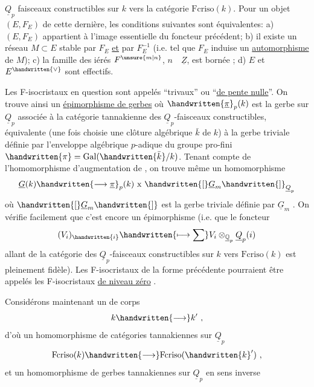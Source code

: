 
$\underline{Q}_p$ faisceaux constructibles sur $k$ vers la catégorie $\mathrm{Fcriso}(k)$. Pour un objet $(E,F_E)$ de cette dernière, les conditions suivantes sont équivalentes: a) $(E,F_E)$ appartient à l'image essentielle du foncteur précédent; b) il existe un réseau $M\subset E$ stable par $F_E$  \uline{et} par $F_E^{-1}$ (i.e. tel que $F_E$ induise un \uline{automorphisme} de $M$); c) la famille des iérés $F^{\unsure{m|n}}$, $n\quad\underline{Z}$, est bornée ; d) $E$ et $E^{\handwritten{\vee}}$ sont effectifs.

Les F-isocristaux en question sont appelés ``trivaux'' ou ``\uline{de pente nulle}''. On trouve ainsi un \uline{épimorphisme de gerbes}
où $\handwritten{\underline{\pi}}_p(k)$ est la gerbe sur $\underline{Q}_p$  associée à la catégorie tannakienne des $\underline{Q}_p$-faisceaux constructibles, équivalente  (une fois choisie une clôture algébrique $\bar{k}$ de $k$) à la gerbe triviale définie par l'enveloppe algébrique  $p$-adique du groupe pro-fini $\handwritten{\pi}=\operatorname{Gal}(\handwritten{\bar{k}}/k)$. Tenant compte de l'homomorphisme d'augmentation de , on trouve même un homomorphisme
\[
\underline{G}(k)\handwritten{\longrightarrow\underline{\pi}}_p(k)\ \mathrm{x}\ \handwritten{[}\underline{G}_m\handwritten{]}_{\underline{Q}_p}
\]
où $\handwritten{[}\underline{G}_m\handwritten{]}$ est la gerbe triviale définie par $\underline{G}_m$ . On vérifie facilement que c'est encore un épimorphisme (i.e. que le foncteur
\[
(V_i)_{\handwritten{i}}\handwritten{\longmapsto\sum}V_i\otimes_{\underline{\mathbb{Q}}_p}\underline{Q}_p(i)
\]
allant de la catégorie des  $\underline{Q}_p$-faisceaux constructibles  sur $k$ vers $\mathrm{Fcriso}(k)$ est pleinement fidèle). Les F-isocristaux de la forme précédente pourraient être appelés les F-isocristaux \uline{de niveau zéro} .

 Considérons maintenant un  de corps
\[
k\handwritten{\longrightarrow}k'\ ,
\]
d'où un homomorphisme de catégories tannakiennes sur $\underline{Q}_p$
\[
\mathrm{Fcriso}(k)\handwritten{\longrightarrow}\mathrm{Fcriso}(\handwritten{k}')\ ,
\]
et un homomorphisme de gerbes tannakiennes sur $\underline{Q}_p$ en sens inverse
